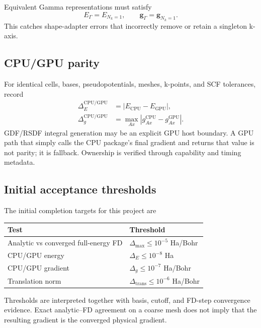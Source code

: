 Equivalent Gamma representations must satisfy
\begin{equation}
  E_{\Gamma}=E_{N_k=1},
  \qquad
  \mathbf g_{\Gamma}=\mathbf g_{N_k=1}.
  \label{eq:gamma-one-kpoint-parity}
\end{equation}
This catches shape-adapter errors that incorrectly remove or retain a
singleton k-axis.

\subsection{CPU/GPU parity}

For identical cells, bases, pseudopotentials, meshes, k-points, and SCF
tolerances, record
\begin{align}
  \Delta_E^{\mathrm{CPU/GPU}}
  &=|E_{\mathrm{CPU}}-E_{\mathrm{GPU}}|,
  \label{eq:cpu-gpu-energy-error}\\
  \Delta_g^{\mathrm{CPU/GPU}}
  &=\max_{Ax}|g_{Ax}^{\mathrm{CPU}}-g_{Ax}^{\mathrm{GPU}}|.
  \label{eq:cpu-gpu-gradient-error}
\end{align}
GDF/RSDF integral generation may be an explicit GPU host boundary.  A GPU path
that simply calls the CPU package's final gradient and returns that value is
not parity; it is fallback.  Ownership is verified through capability and
timing metadata.

\subsection{Initial acceptance thresholds}

The initial completion targets for this project are
\begin{center}
\begin{tabular}{ll}
\toprule
Test & Threshold \\
\midrule
Analytic vs converged full-energy FD & $\Delta_{\max}\le10^{-5}$ Ha/Bohr \\
CPU/GPU energy & $\Delta_E\le10^{-8}$ Ha \\
CPU/GPU gradient & $\Delta_g\le10^{-7}$ Ha/Bohr \\
Translation norm & $\Delta_{\mathrm{trans}}\le10^{-6}$ Ha/Bohr \\
\bottomrule
\end{tabular}
\end{center}
Thresholds are interpreted together with basis, cutoff, and FD-step
convergence evidence.  Exact analytic--FD agreement on a coarse mesh does not
imply that the resulting gradient is the converged physical gradient.

